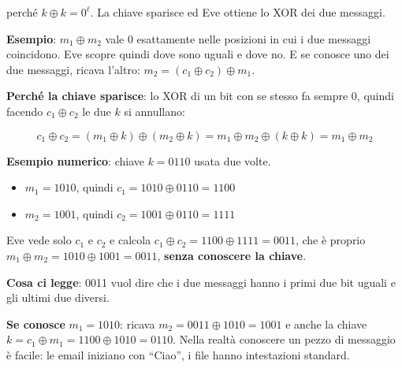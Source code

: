 perché \(k \oplus k = 0^\ell\). La chiave sparisce ed Eve ottiene lo XOR dei due messaggi.

\begin{esempio}

\textbf{Esempio}: \(m_1 \oplus m_2\) vale 0 esattamente nelle posizioni in cui i due messaggi coincidono. Eve scopre quindi dove sono uguali e dove no. E se conosce uno dei due messaggi, ricava l'altro: \(m_2 = (c_1 \oplus c_2) \oplus m_1\).

\end{esempio}

\textbf{Perché la chiave sparisce}: lo XOR di un bit con se stesso fa sempre 0, quindi facendo \(c_1 \oplus c_2\) le due \(k\) si annullano:

\[
c_1 \oplus c_2 = (m_1 \oplus k) \oplus (m_2 \oplus k) = m_1 \oplus m_2 \oplus (k \oplus k) = m_1 \oplus m_2
\]

\begin{esempio}

\textbf{Esempio numerico}: chiave \(k = 0110\) usata due volte.

\begin{itemize}
\item
  \(m_1 = 1010\), quindi \(c_1 = 1010 \oplus 0110 = 1100\)
\item
  \(m_2 = 1001\), quindi \(c_2 = 1001 \oplus 0110 = 1111\)
\end{itemize}

Eve vede solo \(c_1\) e \(c_2\) e calcola \(c_1 \oplus c_2 = 1100 \oplus 1111 = 0011\), che è proprio \(m_1 \oplus m_2 = 1010 \oplus 1001 = 0011\), \textbf{senza conoscere la chiave}.

\end{esempio}

\begin{nota}

\textbf{Cosa ci legge}: 0011 vuol dire che i due messaggi hanno i primi due bit uguali e gli ultimi due diversi.

\end{nota}

\begin{nota}

\textbf{Se conosce} \(m_1 = 1010\): ricava \(m_2 = 0011 \oplus 1010 = 1001\) e anche la chiave \(k = c_1 \oplus m_1 = 1100 \oplus 1010 = 0110\). Nella realtà conoscere un pezzo di messaggio è facile: le email iniziano con ``Ciao'', i file hanno intestazioni standard.

\end{nota}

